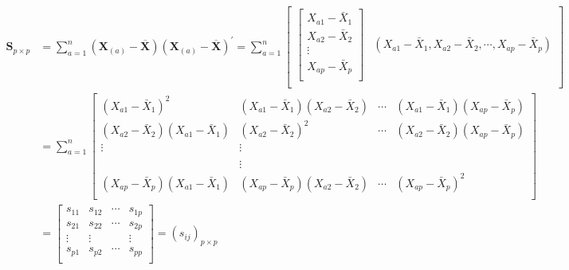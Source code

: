 \documentclass[12pt]{book}
\begin{document}
\begin{align*}

    \mathbf{S}_{p\times p}
     & = \sum_{a=1}^{n}{\left(\mathbf{X}_{\left(a\right)}-\overline{\mathbf{X}}\right)\left(\mathbf{X}_{\left(a\right)}-\overline{\mathbf{X}}\right)^\prime}
    = \sum_{a=1}^{n}
    \begin{bmatrix}
        \begin{bmatrix}
            X_{a1}-{\bar{X}}_1 \\
            X_{a2}-{\bar{X}}_2 \\
            \vdots             \\
            X_{ap}-{\bar{X}}_p \\
        \end{bmatrix}
         & \left(X_{a1}-{\bar{X}}_1,X_{a2}-{\bar{X}}_2,\cdots,X_{ap}-{\bar{X}}_p\right) \\
    \end{bmatrix}                                                                                                                              \\
     & = \sum_{a=1}^{n}
    \begin{bmatrix}
        \left(X_{a1}-{\bar{X}}_1\right)^2
         & \left(X_{a1}-{\bar{X}}_1\right)\left(X_{a2}-{\bar{X}}_2\right)
         & \cdots
         & \left(X_{a1}-{\bar{X}}_1\right)\left(X_{ap}-{\bar{X}}_p\right) \\

        \left(X_{a2}-{\bar{X}}_2\right)\left(X_{a1}-{\bar{X}}_1\right)
         & \left(X_{a2}-{\bar{X}}_2\right)^2
         & \cdots
         & \left(X_{a2}-{\bar{X}}_2\right)\left(X_{ap}-{\bar{X}}_p\right) \\
        \vdots
         & \vdots                                                         \\
         & \                                                              \\
         & \vdots                                                         \\
        \left(X_{ap}-{\bar{X}}_p\right)\left(X_{a1}-{\bar{X}}_1\right)
         & \left(X_{ap}-{\bar{X}}_p\right)\left(X_{a2}-{\bar{X}}_2\right)
         & \cdots
         & \left(X_{ap}-{\bar{X}}_p\right)^2                              \\
    \end{bmatrix}                                                                                                                               \\
     & = \begin{bmatrix}
        s_{11} & s_{12} & \cdots & s_{1p} \\
        s_{21} & s_{22} & \cdots & s_{2p} \\
        \vdots & \vdots & \      & \vdots \\
        s_{p1} & s_{p2} & \cdots & s_{pp} \\
    \end{bmatrix}
    = \left(s_{ij}\right)_{p\times p}
\end{align*}
\end{document}
